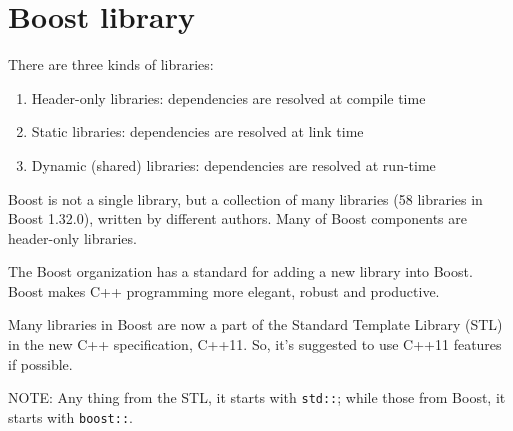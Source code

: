 \chapter{Boost library}
\label{chap:Boost-library}
\label{sec:Boost-library}

There are three kinds of libraries:
\begin{enumerate}
  \item Header-only libraries: dependencies are resolved at compile time
  \item Static libraries: dependencies are resolved at link time
  \item Dynamic (shared) libraries: dependencies are resolved at run-time
\end{enumerate}

Boost is not a single library, but a collection of many libraries (58
libraries in Boost 1.32.0), written by different authors. Many of Boost
components are header-only libraries. 

The Boost organization has a standard for adding a new library into Boost. Boost
makes C++ programming more elegant, robust and productive.

Many libraries in Boost are now a part of the Standard Template Library (STL) in
the new C++ specification, C++11. So, it's suggested to use C++11 features if
possible. 

NOTE: Any thing from the STL, it starts with \verb!std::!; while those from
Boost, it starts with \verb!boost::!. 


